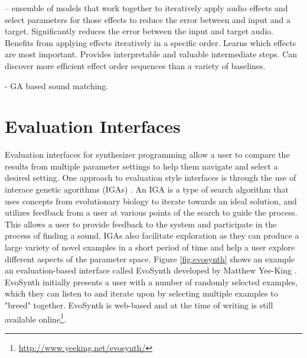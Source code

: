 \cite{mitcheltree2021serumrnn} -- ensemble of models that work together to iteratively apply audio effects and select parameters for those effects to reduce the error between and input and a target. Significantly reduces the error between the input and target audio. Benefits from applying effects iteratively in a specific order. Learns which effects are most important. Provides interpretable and valuable intermediate steps. Can discover more efficient effect order sequences than a variety of baselines.

\cite{masudo2021quality} - GA based sound matching.

\section{Evaluation Interfaces}
Evaluation interfaces for synthesizer programming allow a user to compare the results from multiple parameter settings to help them navigate and select a desired setting. One approach to evaluation style interfaces is through the use of interace genetic agorithms (IGAs) \cite{johnson1999exploring, dahlstedt2001creating, yee2016use}. An IGA is a type of search algorithm that uses concepts from evolutionary biology to iterate towards an ideal solution, and utilizes feedback from a user at various points of the search to guide the process. This allows a user to provide feedback to the system and participate in the process of finding a sound. IGAs also facilitate exploration as they can produce a large variety of novel examples in a short period of time and help a user explore different aspects of the parameter space. Figure \ref{fig:evosynth} shows an example an evaluation-based interface called EvoSynth developed by Matthew Yee-King \cite{yee2016use}. EvoSynth initially presents a user with a number of randomly selected examples, which they can listen to and iterate upon by selecting multiple examples to "breed" together. EvoSynth is web-based and at the time of writing is still available online\footnote{\url{http://www.yeeking.net/evosynth/}}.

